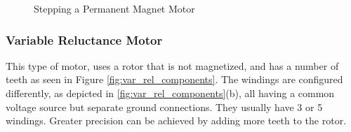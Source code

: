\begin{figure}[htp]
    \begin{center}
    \hfill
    \hfill
  	\hfill
  	\caption{Stepping a Permanent Magnet Motor}
  	\label{fig:stepping_perm_magn}
    \end{center}
\end{figure}

\subsubsection{Variable Reluctance Motor}
This type of motor, uses a rotor that is not magnetized, and has a number of teeth as seen in Figure \ref{fig:var_rel_components}. The windings are configured differently, as depicted in \ref{fig:var_rel_components}(b), all having a common voltage source but separate ground connections.
They usually have 3 or 5 windings.
Greater precision can be achieved by adding more teeth to the rotor.

